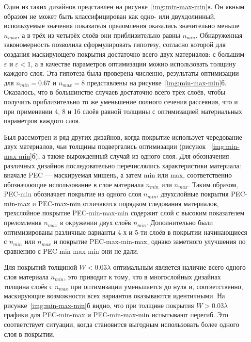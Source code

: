 Один из таких дизайнов представлен на
рисунке~\ref{img:min-max-min}в. Он явным образом не может быть
классифицирован как одно- или двухдолинный, используемые значения
показателя преломления оказались значительно меньше $n_{max}$, а в
трёх из четырёх слоёв они приблизительно равны $n_{min}$.
Обнаруженная закономерность позволила сформулировать гипотезу,
согласно которой для создания маскирующего покрытия достаточно
всего двух материалов: с большим $\varepsilon$ и
${\varepsilon<1}$, а в качестве параметров оптимизации можно
использовать толщину каждого слоя. Эта гипотеза была проверена
численно, результаты оптимизации для $n_{min}=0.67$ и $n_{max}=8$
представлены на рисунке~\ref{img:min-max-min}б. Оказалось, что в
большинстве случаев достаточно всего трёх слоёв, чтобы получить приблизительно то же
уменьшение полного сечения рассеяния, что и при применении 4, 8 и
16 слоёв равной толщины с оптимизацией материальных параметров каждого
слоя.

Был рассмотрен и ряд других дизайнов, когда покрытие использует
чередование двух материалов, чьи толщины подвергались оптимизации
(рисунок ~\ref{img:min-max-min}б), а также вырожденный случай
из одного слоя.  Для обозначения различных
дизайнов последовательно перечислялись характеристики материала:
вначале PEC --- маскируемая мишень, а затем min или max,
соответственно обозначающие использование в слое материала $n_{min}$
или $n_{max}$. Таким образом, PEC-min обозначает покрытие из одного
слоя $n_{min}$, двухслойные покрытия PEC-min-max и PEC-max-min
отличаются порядком следования материалов, трехслойное покрытие
PEC-min-max-min содержит слой с высоким показателем преломления
$n_{max}$ в окружении двух слоёв $n_{min}$. Дополнительно были
оптимизированы различные варианты 4-х и 5-ти слоёв в покрытии
начинающиеся с $n_{min}$ или $n_{max}$ и покрытие PEC-max-min-max, однако
заметного улучшения по сравнению с PEC-min-max-min они не дали.

Для покрытий толщиной $W<0.03\lambda$ оптимальным является наличие
всего одного слоя материала $n_{min}$, это приводит к тому, что в
многослойных дизайнах толщина слоёв с $n_{max}$ при оптимизации
уменьшается до нуля и, соответственно, маскирующие возможности всех
вариантов оказываются идентичными. На
рисунке~\ref{img:min-max-min}б видно, что при толщине покрытия
$W>0.03\lambda$ графики для PEC-min-max и PEC-min-max-min испытывают
перегиб. Это соответствует ситуации, когда становится выгодным
использовать более одного слоя в покрытии.


